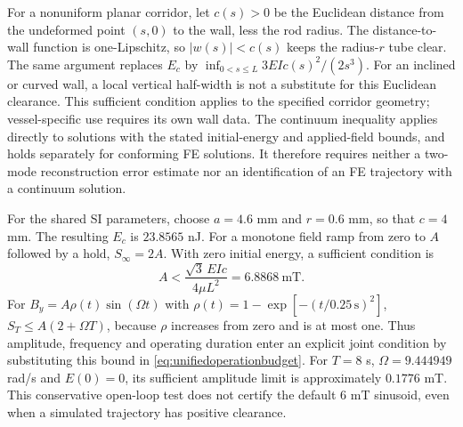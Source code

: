 For a nonuniform planar corridor, let $c(s)>0$ be the Euclidean distance
from the undeformed point $(s,0)$ to the wall, less the rod radius.
The distance-to-wall function is one-Lipschitz, so $|w(s)|<c(s)$
keeps the radius-$r$ tube clear. The same argument replaces $E_c$ by
$\inf_{0<s\leq L}3EIc(s)^2/(2s^3)$.
For an inclined or curved wall, a local vertical half-width is not
a substitute for this Euclidean clearance.
This sufficient condition applies to the specified corridor geometry;
vessel-specific use requires its own wall data. The continuum inequality
applies directly to solutions with the stated initial-energy and
applied-field bounds, and holds separately for conforming FE solutions.
It therefore requires neither a two-mode reconstruction error estimate
nor an identification of an FE trajectory with a continuum solution.

For the shared SI parameters, choose $a=4.6$ mm and $r=0.6$ mm, so that
$c=4$ mm.  The resulting $E_c$ is $23.8565$ nJ.
For a monotone field ramp from zero to $A$ followed by a hold,
$S_\infty=2A$.  With zero initial energy, a sufficient condition is
\begin{equation}
 A<\frac{\sqrt3\,EIc}{4\mu L^2}=6.8868\ \mathrm{mT}.
 \label{eq:unifiedramplimit}
\end{equation}
For $B_y=A\rho(t)\sin(\Omega t)$ with
$\rho(t)=1-\exp[-(t/0.25\,\mathrm{s})^2]$,
$S_T\leq A(2+\Omega T)$, because $\rho$ increases from zero and is at most
one.  Thus amplitude, frequency and operating duration enter an explicit
joint condition by substituting this bound in
\eqref{eq:unifiedoperationbudget}.
For $T=8$ s, $\Omega=9.444949$ rad/s and $E(0)=0$, its sufficient amplitude
limit is approximately $0.1776$ mT.  This conservative open-loop test does
not certify the default $6$ mT sinusoid, even when a simulated trajectory
has positive clearance.

